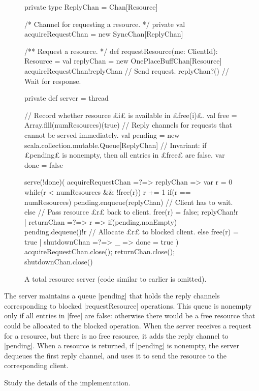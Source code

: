 \begin{figure}
\begin{scala}
  private type ReplyChan = Chan[Resource]

  /* Channel for requesting a resource. */
  private val acquireRequestChan = new SyncChan[ReplyChan]

  /** Request a resource. */
  def requestResource(me: ClientId): Resource = {
    val replyChan = new OnePlaceBuffChan[Resource]
    acquireRequestChan!replyChan  // Send request.
    replyChan?() // Wait for response.
  }

  private def server = thread{
    // Record whether resource £i£ is available in £free(i)£.
    val free = Array.fill(numResources)(true)
    // Reply channels for requests that cannot be served immediately.
    val pending = new scala.collection.mutable.Queue[ReplyChan]
    // Invariant: if £pending£ is nonempty, then all entries in £free£ are false.
    var done = false

    serve(!done)(
      acquireRequestChan =?=> { replyChan =>
	var r = 0
	while(r < numResources && !free(r)) r += 1
	if(r == numResources) 
          pending.enqueue(replyChan) // Client has to wait.
        else{  // Pass resource £r£ back to client. 
	  free(r) = false; replyChan!r
        }
      }
      | returnChan =?=> { r =>
          if(pending.nonEmpty)
            pending.dequeue()!r // Allocate £r£ to blocked client.
          else free(r) = true
      }
      | shutdownChan =?=> { _ => done = true }
    )
    acquireRequestChan.close(); returnChan.close(); shutdownChan.close()
  }
\end{scala}
\caption{A total resource server (code similar to earlier is omitted).}
\label{fig:totalRAServer}
\end{figure}

The server maintains a queue |pending| that holds the reply channels
corresponding to blocked |requestResource| operations.  This queue is nonempty
only if all entries in |free| are false: otherwise there would be a free
resource that could be allocated to the blocked operation.  When the server
receives a request for a resource, but there is no free resource, it adds the
reply channel to |pending|.  When a resource is returned, if |pending| is
nonempty, the server dequeues the first reply channel, and uses it to send the
resource to the corresponding client.

\begin{instruction}
Study the details of the implementation.
\end{instruction}

